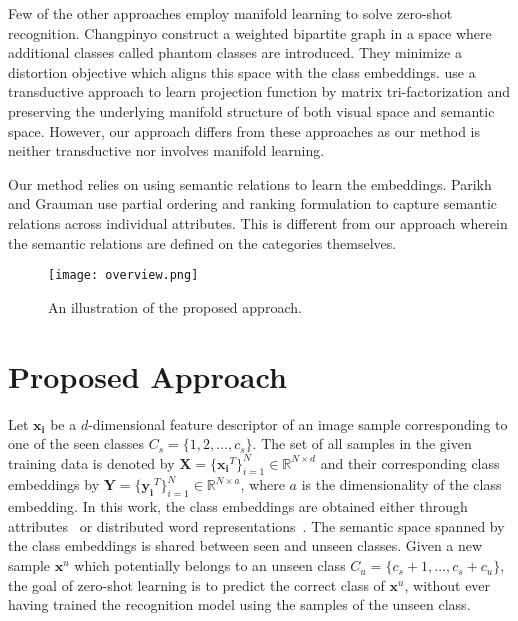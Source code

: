 \documentclass[10pt,twocolumn,letterpaper]{article}
\begin{document}
 
Few of the other approaches employ manifold learning \cite{changpinyo2016synthesized,Xu_2017_CVPR, Morgado_2017_CVPR} to solve zero-shot recognition. Changpinyo \etal \cite{changpinyo2016synthesized} construct a weighted bipartite graph in a space where additional classes called phantom classes are introduced. They minimize a distortion objective which aligns this space with the class embeddings. \cite{Xu_2017_CVPR} use a transductive approach to learn projection function by matrix tri-factorization and preserving the underlying manifold structure of both visual space and semantic space.
However, our approach differs from these approaches as our method is neither transductive nor involves manifold learning.

Our method relies on using semantic relations to learn the embeddings. Parikh and Grauman \cite{parikh2011relative} use partial ordering and ranking formulation to capture semantic relations across individual attributes. This is different from our approach wherein the semantic relations are defined on the categories themselves.
\begin{figure*}[t!]
\centering
\texttt{[image: overview.png]}
\caption{\small An illustration of the proposed approach.}
\label{main}
\end{figure*}


\section{Proposed Approach}
\label{proposed}
Let $\mathbf{x_i}$ be a $d$-dimensional feature descriptor of an image sample corresponding to one of the seen classes $C_s =\{1,2,\dots,c_s\}$. The set of all samples in the given training data is denoted by $\mathbf{X} = \{\mathbf{x_i}^T\}_{i=1}^{N}$$\in \mathbb{R}^{N\times d}$ and their corresponding class embeddings by $\mathbf{Y} =\{\mathbf{y_i}^T\}_{i=1}^{N}$$\in \mathbb{R}^{N\times a}$, where $a$ is the dimensionality of the class embedding. In this work, the class embeddings are obtained either through attributes~\cite{farhadi2009describing,lampert2009learning,wah2011caltech,xiao2010sun} or distributed word representations~\cite{mikolov2013distributed}. %
The semantic space spanned by the class embeddings is shared between seen and unseen classes.  
Given a new sample $\mathbf{x}^u$ which potentially belongs to an unseen class $C_u=\{c_s+1,\dots,c_s+c_u\}$,  the goal of zero-shot learning is to predict the correct class of $\mathbf{x}^u$, without ever having trained the recognition model using the samples of the unseen class. %
\end{document}

